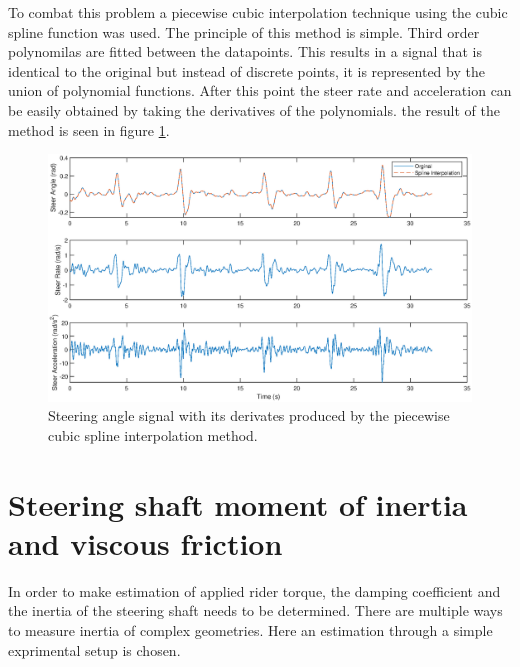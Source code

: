 To combat this problem a piecewise cubic interpolation technique using the cubic spline function was used. The principle of this method is simple. Third order polynomilas are fitted   between the datapoints. This results in a signal that is identical to the original but instead of discrete points, it is represented by the union of polynomial functions. After this point the steer rate and acceleration can be easily obtained by taking the derivatives of the polynomials. the result of the method is seen in figure \ref{fig:spline}. 
\begin{figure}[ht]
    \centering
    \captionsetup{justification=centering,margin=2cm}

    \includegraphics[scale=0.6]{images/steer_rates_spline.eps}
    \caption{Steering angle signal with its derivates produced by the piecewise cubic spline interpolation method.}
    \label{fig:spline}
\end{figure}
\section{Steering shaft moment of inertia and viscous friction}

In order to make estimation of applied rider torque, the damping coefficient and the inertia of the steering shaft needs to be determined. There are multiple ways to measure inertia of complex geometries. Here an estimation through a simple exprimental setup is chosen.


